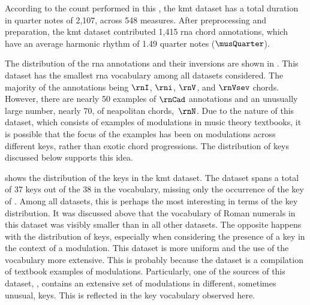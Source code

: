 
According to the count performed in this \thesisdiss{}, the
\gls{kmt} dataset has a total duration in quarter notes of
2,107, across 548 measures. After preprocessing and
preparation, the \gls{kmt} dataset contributed 1,415
\gls{rna} chord annotations, which have an average harmonic
rhythm of 1.49 quarter notes ($\musQuarter$).

The distribution of the \gls{rna} annotations and their
inversions are shown in . This
dataset has the smallest \gls{rna} vocabulary among all
datasets considered. The majority of the annotations being
$\rnI$, $\rni$, $\rnV$, and $\rnVsev$ chords. However, there
are nearly 50 examples of $\rnCad$ annotations and an
unusually large number, nearly 70, of \gls{neapolitan}
chords,~$\rnN$. Due to the nature of this dataset, which
consists of examples of modulations in music theory
textbooks, it is possible that the focus of the examples has
been on modulations across different keys, rather than
exotic chord progressions. The distribution of keys
discussed below supports this idea.



 shows the distribution of the keys
in the \gls{kmt} dataset. The dataset spans a total of 37
keys out of the 38 in the vocabulary, missing only the
occurrence of the key of \keyBbb{}. Among all datasets, this
is perhaps the most interesting in terms of the key
distribution. It was discussed above that the vocabulary of
Roman numerals in this dataset was visibly smaller than in
all other datasets. The opposite happens with the
distribution of keys, especially when considering the
presence of a key in the context of a modulation. This
dataset is more uniform and the use of the vocabulary more
extensive. This is probably because the dataset is a
compilation of textbook examples of modulations.
Particularly, one of the sources of this dataset,
\textcite{reger1904supplement}, contains an extensive set of
modulations in different, sometimes unusual, keys. This is
reflected in the key vocabulary observed here.
